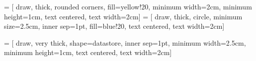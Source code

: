 \makeatletter
{}
\makeatother
{} = [
    draw,
    thick,
    rounded corners,
    fill=yellow!20,
    minimum width=2cm, 
    minimum height=1cm,
    text centered, 
    text width=2cm]
 = [
    draw,
    thick,
    circle,
    minimum size=2.5cm,
    inner sep=1pt,
    fill=blue!20,
    text centered, 
    text width=2cm]

 = [
    draw,
    very thick,
    shape=datastore,
    inner sep=1pt,
    minimum width=2.5cm, 
    minimum height=1cm,
    text centered, 
    text width=2cm]

